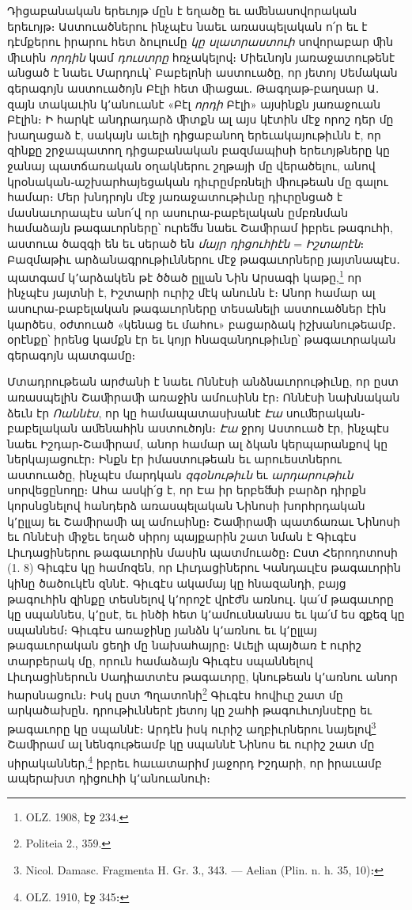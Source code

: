 \documentclass{article}
\begin{document}
{Դիցաբանական երեւոյթ մըն է եղածը եւ աﬔնասովորական երեւոյթ։ Աստուածներու ինչպէս նաեւ առասպելական ո՛ր եւ է դէմքերու իրարու հետ ձուլումը \emph{կը սլատրաստուի} սովորաբար ﬕն ﬕւսին \emph{որդին} կամ \emph{դուստրը} հռչակելով։ Միեւնոյն յառաջատութենէ անցած է նաեւ Մարդուկ՝ Բաբելոնի աստուածը, որ յետոյ Սեմական գերագոյն աստուածոյն Բէլի հետ ﬕացաւ․ Թագղաթ֊բաղսար Ա․ զայն տակաւին կ՚անուանէ «Բէլ \emph{որդի} Բէլի» այսինքն յառաջուան Բէլին։ Ի հարկէ անդրադարձ ﬕտքն ալ այս կէտին մէջ որոշ դեր մը խաղացաձ է, սակայն աւելի դիցաբանող երեւակայութիւնն է, որ զինքը շրջապատող դիցաբանական բազմապիսի երեւոյթները կը ջանայ պատճառական օղակներու շղթայի մը վերածելու, անով կրօնական֊աշխարհայեցական դիւրըմբռնելի ﬕութեան մը գալու համար։ Մեր խնդրոյն մէջ յառաջատութիւնը դիւրընցած է մասնաւորապէս անո՛վ որ ասուրա֊բաբելական ըմբռնման համաձայն թագաւորները՝ ուրեﬓ նաեւ Շաﬕրամ իբրեւ թագուհի, աստուա ծազգի են եւ սերած են \emph{մայր դիցուհիէն} = \emph{Իշտարէն}։ Բազմաթիւ արձանագրութիւններու մէջ թագաւորները յայտնապէս․ պատգամ կ՚արձակեն թէ ծծած ըլլան Նին Արսագի կաթը,\footnote{OLZ. 1908, էջ 234.} որ ինչպէս յայտնի է, Իշտարի ուրիշ մէկ անունն է։ Անոր համար ալ ասուրա֊բաբելական թագաւորները տեսանելի աստուածներ էին կարծես, օժտուած «կենաց եւ մահու» բացարձակ իշխանութեամբ․ օրէնքը՝ իրենց կամքն էր եւ կոյր հնազանդութիւնը՝ թագաւորական գերագոյն պատգամը։

Մտադրութեան արժանի է նաեւ Ոննէսի անձնաւորութիւնը, որ ըստ առասպելին Շաﬕրաﬕ առաջին ամուսինն էր։ Ոննէսի նախնական ձեւն էր \emph{Ոաննէս}, որ կը համապատասխանէ \emph{Էա} սուﬔրական֊բաբելական աﬔնահին աստուծոյն։ \emph{Էա} ջրոյ Աստուած էր, ինչպէս նաեւ Իշդար֊Շաﬕրամ, անոր համար ալ ձկան կերպարանքով կը ներկայացուէր։ Ինքն էր իմաստութեան եւ արուեստներու աստուածը, ինչպէս մարդկան \emph{զգօնութիւն} եւ \emph{արդարութիւն} սորվեցընողը։ Ահա ասկի՛ց է, որ Էա իր երբեﬓի բարձր դիրքն կորսնցնելով հանդերձ առասպելական Նինոսի խորհրդական կ՚ըլլայ եւ Շաﬕրաﬕ ալ ամուսինը։ Շաﬕրաﬕ պատճառաւ Նինոսի եւ Ոննէսի ﬕջեւ եղած սիրոյ պայքարին շատ նման է Գիւգէս Լիւդացիներու թագաւորին մասին պատմուածը։ Ըստ Հերոդոտոսի (1. 8) Գիւգէս կը համոզեն, որ Լիւդացիներու Կանդաւլէս թագաւորին կինը ծածուկէն զննէ․ Գիւգէս ակամայ կը հնազանդի, բայց թագուհին զինքը տեսնելով կ՚որոշէ վրէժն առնուլ․ կա՛մ թագաւորը կը սպաննես, կ՚ըսէ, եւ ինծի հետ կ՚ամուսնանաս եւ կա՛մ ես զքեզ կը սպաննեմ։ Գիւգէս առաջինը յանձն կ՚առնու եւ կ՚ըլլայ թագաւորական ցեղի մը նախահայրը։ Աւելի պայծառ է ուրիշ տարբերակ մը, որուն համաձայն Գիւգէս սպաննելով Լիւդացիներուն Սադիատտէս թագաւորը, կնութեան կ՚առնու անոր հարսնացուն։ Իսկ ըստ Պղատոնի\footnote{Politeia 2., 359.} Գիւգէս հովիւը շատ մը արկածախըն․ դրութիւններէ յետոյ կը շահի թագուհւոյնսէրը եւ թագաւորը կը սպաննէ։ Արդէն իսկ ուրիշ աղբիւրներու նայելով\footnote{Nicol. Damasc. Fragmenta H. Gr. 3., 343. — Aelian (Plin. n. h. 35, 10)։} Շաﬕրամ ալ նենգութեամբ կը սպաննէ Նինոս եւ ուրիշ շատ մը սիրականներ,\footnote{OLZ. 1910, էջ 345։} իբրեւ հաւատարիմ յաջորդ Իշդարի, որ իրաւամբ ապերախտ դիցուհի կ՚անուանուի։

}
\end{document}
